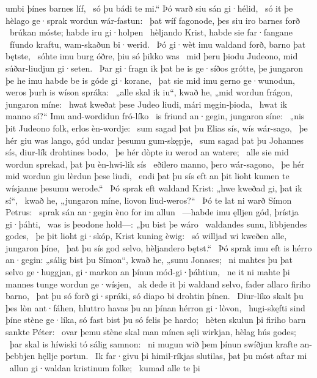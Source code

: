 umbi þínes barnes líf, \hld\ só þu bádi te mi.“
Þó warð siu sán gi·hélid, \hld\ só it þe hèlago ge·sprak
wordun wár-fastun: \hld\ þat wíf fagonode,
þes siu iro barnes forð \hld\ brúkan móste;
habde iru gi·holpen \hld\ hèljando Krist,
habde sie far·fangane \hld\ fíundo kraftu,
wam-skaðun bi·werid. \hld\ Þó gi·wèt imu waldand forð,
barno þat bętste, \hld\ sóhte imu burg óðre,
þiu só þikko was \hld\ mid þeru þiodu Judeono,
mid súðar-liudjun gi·seten. \hld\ Þar gi·fragn ik þat he is ge·síðos grótte,
þe jungaron þe he imu habde be is góde gi·korane, \hld\ þat sie mid imu gerno ge·wunodun,
weros þurh is wíson spráka: \hld\ „alle skal ik iu“, kwað he, „mid wordun frágon,
jungaron míne: \hld\ hwat kweðat þese Judeo liudi,
mári męgin-þioda, \hld\ hwat ik manno sí?“
Imu and-wordidun fró-líko \hld\ is friund an·gegin,
jungaron síne: \hld\ „nis þit Judeono folk,
erlos èn-wordje: \hld\ sum sagad þat þu Elias sís,
wís wár-sago, \hld\ þe hér giu was lango,
gód undar þesumu gum-skępje, \hld\ sum sagad þat þu Johannes sís,
diur-lík drohtines bodo, \hld\ þe hér dòpte iu
werod an watere; \hld\ alle sie mid wordun sprekad,
þat þu èn-hwi-lik sís \hld\ eðilero manno,
þero wár-sagono, \hld\ þe hér mid wordun giu
lèrdun þese liudi, \hld\ endi þat þu sís eft an þit lioht kumen
te wísjanne þesumu werode.“ \hld\ Þó sprak eft waldand Krist:
„hwe kweðad gi, þat ik sí“, \hld\ kwað he, „jungaron míne,
liovon liud-weros?“ \hld\ Þó te lat ni warð
Símon Petrus: \hld\ sprak sán an·gegin
èno for im allun \hld\ —habde imu ęlljen gód,
þrístja gi·þáhti, \hld\ was is þeodone hold—:
„þu bist þe wáro \hld\ waldandes sunu,
libbjendes godes, \hld\ þe þit lioht gi·skóp,
Krist kuning èwig: \hld\ só willjad wi kweðen alle,
jungaron þíne, \hld\ þat þu sís god selvo,
hèljandero bętst.“ \hld\ Þó sprak imu eft is hérro an·gegin:
„sálig bist þu Símon“, kwað he, „sunu Jonases; \hld\ ni mahtes þu þat selvo ge·huggjan,
gi·markon an þínun mód-gi·þáhtiun, \hld\ ne it ni mahte þi mannes tunge
wordun ge·wísjen, \hld\ ak dede it þi waldand selvo,
fader allaro firiho barno, \hld\ þat þu só forð gi·spráki,
só diapo bi drohtin þínen. \hld\ Diur-líko skalt þu þes lòn ant·fáhen,
hluttro havas þu an þínan hérron gi·lòvon, \hld\ hugi-skęfti sind þíne stène ge·líka,
só fast bist þu só felis þe hardo; \hld\ hèten skulun þi firiho barn
sankte Péter: \hld\ ovar þemu stène skal man mínen sęli wirkjan,
hèlag hús godes; \hld\ þar skal is híwiski tó
sálig samnon: \hld\ ni mugun wið þem þínun swíðjun krafte
an-þebbjen hęllje portun. \hld\ Ik far·givu þi himil-ríkjas slutilas,
þat þu móst aftar mi \hld\ allun gi·waldan
kristinum folke; \hld\ kumad alle te þi
